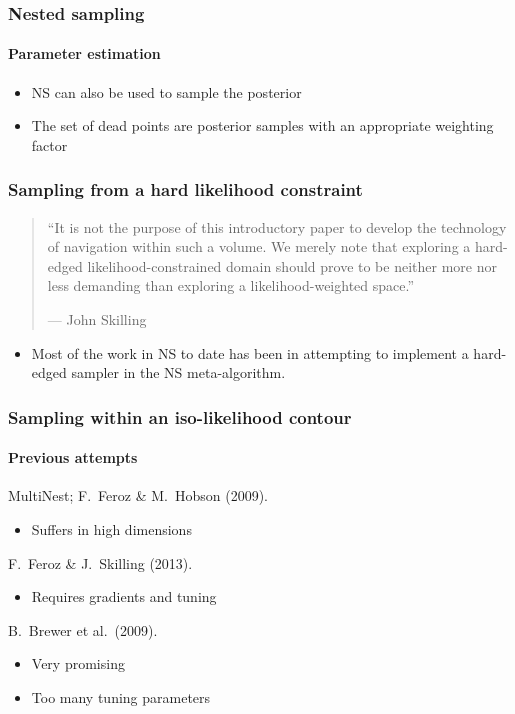 \documentclass[]{beamer}
\begin{document}
\begin{frame}
  \frametitle{Nested sampling} 
  \framesubtitle{Parameter estimation} 

  \begin{itemize}
      \pause
    \item NS can also be used to sample the posterior
      \pause
    \item The set of dead points are posterior samples with an appropriate weighting factor
  \end{itemize}
 
\end{frame}


\begin{frame}
  \frametitle{Sampling from a hard likelihood constraint} 

  \pause
  \begin{quote}
    ``It is not the purpose of this introductory paper to develop the technology of navigation within such a volume. We merely note that exploring a hard-edged likelihood-constrained domain should prove to be neither more nor less demanding than exploring a likelihood-weighted space.''
    
   {\hfill --- John Skilling}
  \end{quote}

  \begin{itemize}
      \pause
    \item Most of the work in NS to date has been in attempting to implement a hard-edged sampler in the NS meta-algorithm.
  \end{itemize}
 
\end{frame}


\begin{frame}
  \frametitle{Sampling within an iso-likelihood contour}
  \framesubtitle{Previous attempts}


  \begin{description}
    \pause\item[Rejection Sampling] MultiNest; F.\ Feroz \& M.\ Hobson (2009).
      \begin{itemize}
        \pause\item Suffers in high dimensions
      \end{itemize}
    \pause\item[Hamiltonian sampling] F.\ Feroz \& J.\ Skilling (2013).
      \begin{itemize}
        \pause\item Requires gradients and tuning
      \end{itemize}
    \pause\item[Diffusion Nested Sampling] B.\ Brewer et al.\ (2009).
      \begin{itemize}
        \pause\item Very promising
        \pause\item Too many tuning parameters
      \end{itemize}
  \end{description}

\end{frame}
\end{document}
